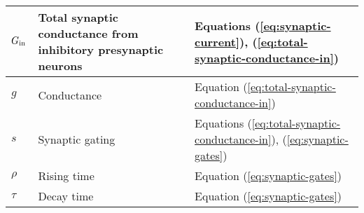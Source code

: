 \begin{longtable}{|m{}|m{}|m{}|}
$G_{\mathrm{in}}$ & Total synaptic conductance from inhibitory presynaptic neurons & Equations (\ref{eq:synaptic-current}), (\ref{eq:total-synaptic-conductance-in}) \\ \hline

$g$ & Conductance & Equation (\ref{eq:total-synaptic-conductance-in}) \\ \hline

$s$ & Synaptic gating & Equations (\ref{eq:total-synaptic-conductance-in}), (\ref{eq:synaptic-gates}) \\ \hline

$\rho$ & Rising time & Equation (\ref{eq:synaptic-gates}) \\ \hline

$\tau$ & Decay time & Equation (\ref{eq:synaptic-gates}) \\ \hline

\end{longtable}